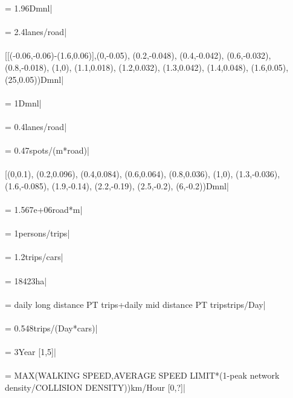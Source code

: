  = 1.96Dmnl| \\ \\ 
 = 2.4lanes/road| \\ \\ 
 [[(-0.06,-0.06)-(1.6,0.06)],(0,-0.05), (0.2,-0.048), (0.4,-0.042), (0.6,-0.032), (0.8,-0.018), (1,0), (1.1,0.018), (1.2,0.032), (1.3,0.042), (1.4,0.048), (1.6,0.05), (25,0.05))Dmnl| \\ \\ 
 = 1Dmnl| \\ \\ 
 = 0.4lanes/road| \\ \\ 
 = 0.47spots/(m*road)| \\ \\ 
 [(0,0.1), (0.2,0.096), (0.4,0.084), (0.6,0.064), (0.8,0.036), (1,0), (1.3,-0.036), (1.6,-0.085), (1.9,-0.14), (2.2,-0.19), (2.5,-0.2), (6,-0.2))Dmnl| \\ \\ 
 = 1.567e+06road*m| \\ \\ 
 = 1persons/trips| \\ \\ 
 = 1.2trips/cars| \\ \\ 
 = 18423ha| \\ \\ 
 = daily long distance PT trips+daily mid distance PT tripstrips/Day| \\ \\ 
 = 0.548trips/(Day*cars)| \\ \\ 
 = 3Year [1,5]| \\ \\ 
 = MAX(WALKING SPEED,AVERAGE SPEED LIMIT*(1-peak network density/COLLISION DENSITY))km/Hour [0,?]| \\ \\ 
